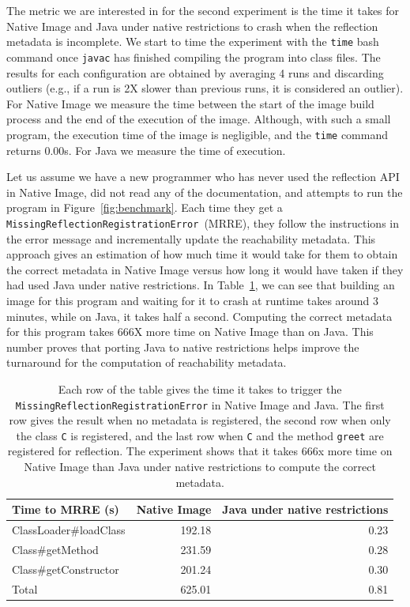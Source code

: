 The metric we are interested in for the second experiment is the time it takes for Native Image and Java under native restrictions to crash when the reflection metadata is incomplete.
We start to time the experiment with the \verb|time| bash command once \verb|javac| has finished compiling the program into class files. 
The results for each configuration are obtained by averaging 4 runs and discarding outliers (e.g., if a run is 2X slower than previous runs, it is considered an outlier).
For Native Image we measure the time between the start of the image build process and the end of the execution of the image. Although, with such a small program, the execution time of the image is negligible, and the \verb|time| command returns 0.00s. For Java we measure the time of execution.

Let us assume we have a new programmer who has never used the reflection API in Native Image, did not read any of the documentation, and attempts to run the program in Figure~\ref{fig:benchmark}. Each time they get a \verb|MissingReflectionRegistrationError|~(MRRE), they follow the instructions in the error message and incrementally update the reachability metadata.
This approach gives an estimation of how much time it would take for them to obtain the correct metadata in Native Image versus how long it would have taken if they had used Java under native restrictions. 
In Table~\ref{tab:benchmark}, we can see that building an image for this program and waiting for it to crash at runtime takes around 3 minutes, while on Java, it takes half a second. Computing the correct metadata for this program takes 666X more time on Native Image than on Java.
This number proves that porting Java to native restrictions helps improve the turnaround for the computation of reachability metadata.

\begin{table}[ht]
\centering
\begin{tabular}{@{}lrr@{}}
\toprule
Time to MRRE (s) & \multicolumn{1}{l}{Native Image} & \multicolumn{1}{l}{Java under native restrictions} \\ \midrule
ClassLoader\#loadClass          & 192.18 & 0.23 \\
Class\#getMethod                & 231.59 & 0.28 \\
Class\#getConstructor           & 201.24 & 0.30 \\ \midrule
Total                           & 625.01 & 0.81 \\ \bottomrule
\end{tabular}
\caption{Each row of the table gives the time it takes to trigger the \texttt{MissingReflectionRegistrationError} in Native Image and Java. The first row gives the result when no metadata is registered, the second row when only the class \texttt{C} is registered, and the last row when \texttt{C} and the method \texttt{greet} are registered for reflection. The experiment shows that it takes 666x more time on Native Image than Java under native restrictions to compute the correct metadata.}
\label{tab:benchmark}
\end{table}
